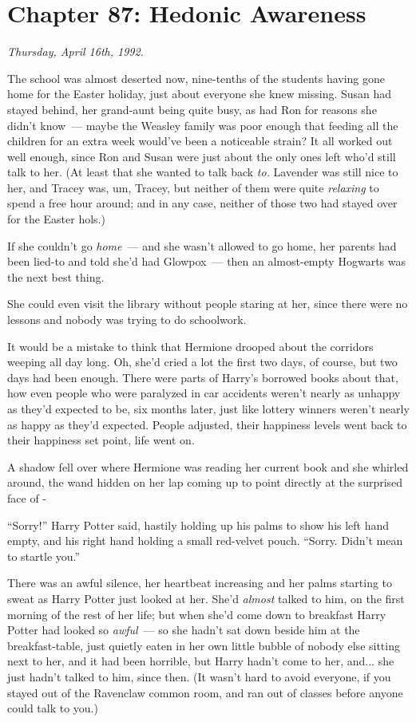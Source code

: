 \chapter{Chapter 87: Hedonic Awareness}
\emph{Thursday, April 16th, 1992.}

The school was almost deserted now, nine-tenths of the students having gone home for the Easter holiday, just about everyone she knew missing. Susan had stayed behind, her grand-aunt being quite busy, as had Ron for reasons she didn't know~--- maybe the Weasley family was poor enough that feeding all the children for an extra week would've been a noticeable strain? It all worked out well enough, since Ron and Susan were just about the only ones left who'd still talk to her. (At least that she wanted to talk back \emph{to.} Lavender was still nice to her, and Tracey was, um, Tracey, but neither of them were quite \emph{relaxing} to spend a free hour around; and in any case, neither of those two had stayed over for the Easter hols.)

If she couldn't go \emph{home}~--- and she wasn't allowed to go home, her parents had been lied-to and told she'd had Glowpox~--- then an almost-empty Hogwarts was the next best thing.

She could even visit the library without people staring at her, since there were no lessons and nobody was trying to do schoolwork.

It would be a mistake to think that Hermione drooped about the corridors weeping all day long. Oh, she'd cried a lot the first two days, of course, but two days had been enough. There were parts of Harry's borrowed books about that, how even people who were paralyzed in car accidents weren't nearly as unhappy as they'd expected to be, six months later, just like lottery winners weren't nearly as happy as they'd expected. People adjusted, their happiness levels went back to their happiness set point, life went on.

A shadow fell over where Hermione was reading her current book and she whirled around, the wand hidden on her lap coming up to point directly at the surprised face of -

``Sorry!'' Harry Potter said, hastily holding up his palms to show his left hand empty, and his right hand holding a small red-velvet pouch. ``Sorry. Didn't mean to startle you.''

There was an awful silence, her heartbeat increasing and her palms starting to sweat as Harry Potter just looked at her. She'd \emph{almost} talked to him, on the first morning of the rest of her life; but when she'd come down to breakfast Harry Potter had looked so \emph{awful}~--- so she hadn't sat down beside him at the breakfast-table, just quietly eaten in her own little bubble of nobody else sitting next to her, and it had been horrible, but Harry hadn't come to her, and... she just hadn't talked to him, since then. (It wasn't hard to avoid everyone, if you stayed out of the Ravenclaw common room, and ran out of classes before anyone could talk to you.)

